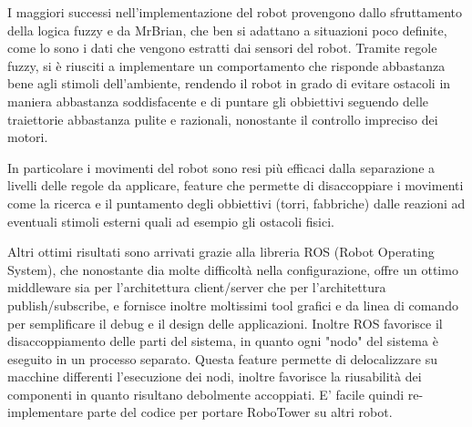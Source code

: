 I maggiori successi nell'implementazione del robot provengono dallo sfruttamento della logica fuzzy e da MrBrian, che ben si adattano a situazioni poco definite, come lo sono i dati che vengono estratti dai sensori del robot. Tramite regole fuzzy, si è riusciti a implementare un comportamento che risponde abbastanza bene agli stimoli dell'ambiente, rendendo il robot in grado di evitare ostacoli in maniera abbastanza soddisfacente e di puntare gli obbiettivi seguendo delle traiettorie abbastanza pulite e razionali, nonostante il controllo impreciso dei motori.

In particolare i movimenti del robot sono resi più efficaci dalla separazione a livelli delle regole da applicare, feature che permette di disaccoppiare i movimenti come la ricerca e il puntamento degli obbiettivi (torri, fabbriche) dalle reazioni ad eventuali stimoli esterni quali ad esempio gli ostacoli fisici.

Altri ottimi risultati sono arrivati grazie alla libreria ROS (Robot Operating System), che nonostante dia molte difficoltà nella configurazione, offre un ottimo middleware sia per l'architettura client/server che per l'architettura publish/subscribe, e fornisce inoltre moltissimi tool grafici e da linea di comando per semplificare il debug e il design delle applicazioni. Inoltre ROS favorisce il disaccoppiamento delle parti del sistema, in quanto ogni "nodo" del sistema è eseguito in un processo separato. Questa feature permette di delocalizzare su macchine differenti l'esecuzione dei nodi, inoltre favorisce la riusabilità dei componenti in quanto risultano debolmente accoppiati. E' facile quindi re-implementare parte del codice per portare RoboTower su altri robot.

